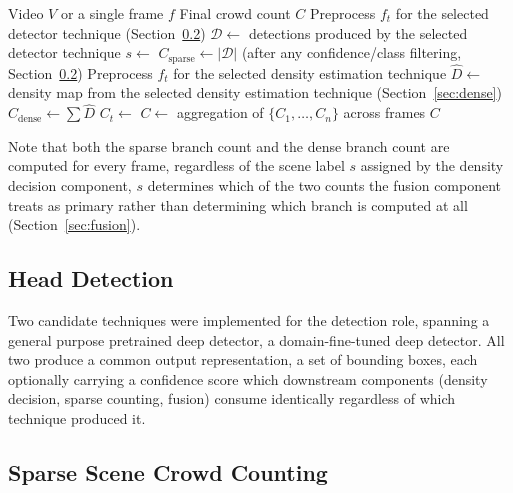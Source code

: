 \documentclass[12pt,a4paper]{report}
\begin{document}
\begin{algorithm}[H]
	\caption{Adaptive Hybrid Crowd Counting}
	\label{alg:overall}
	\begin{algorithmic}[1]
		\Require Video $V$ or a single frame $f$
		\Ensure Final crowd count $C$
		\State Preprocess $f_t$ for the selected detector technique (Section~\ref{sec:sparse})
		\State $\mathcal{D} \gets$ detections produced by the selected detector technique
		\State $s \gets$  
		\State $C_{\text{sparse}} \gets |\mathcal{D}|$ (after any confidence/class filtering, Section~\ref{sec:sparse})
		\State Preprocess $f_t$ for the selected density estimation technique
		\State $\hat D \gets$ density map from the selected density estimation technique (Section~\ref{sec:dense})
		\State $C_{\text{dense}} \gets \sum \hat D$ 
		\State $C_t \gets$  
		\EndFor
		\State $C \gets$ aggregation of $\{C_1,\dots,C_n\}$ across frames 
		\State \Return $C$
	\end{algorithmic}
\end{algorithm}

Note that both the sparse branch count and the dense branch count are computed for every frame, regardless of the scene label $s$ assigned by the density decision component, $s$ determines which of the two counts the fusion component treats as primary rather than determining which branch is computed at all (Section~\ref{sec:fusion}).

\subsection{Head Detection}
\label{sec:sparse-detection}

Two candidate techniques were implemented for the detection role, spanning a general purpose pretrained deep detector, a domain-fine-tuned deep detector. All two produce a common output representation, a set of bounding boxes, each optionally carrying a confidence score which downstream components (density decision, sparse counting, fusion) consume identically regardless of which technique produced it.

\subsection{Sparse Scene Crowd Counting}
\label{sec:sparse}
\end{document}
